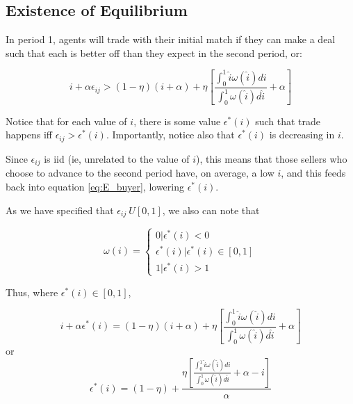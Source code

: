 \documentclass[WP]{AEA}
\begin{document}
\subsection{Existence of Equilibrium}

In period 1, agents will trade with their initial match if they can make a deal such that each is better off than they expect in the second period, or:

\begin{equation} \label{eq:ec_condition_raw}
 i+\alpha \epsilon_{ij} >(1-\eta)(i+\alpha ) + \eta  \left[ \frac{\int_0^1 \hat{i} \omega(\hat{i}) di}{\int_0^1  \omega(\hat{i}) d\hat{i}} + \alpha \right] 
 \end{equation}

Notice that for each value of $i$, there is some value $\epsilon^* (i)$ such that trade happens iff $\epsilon_{ij} > \epsilon^* (i)$.  Importantly, notice also that $\epsilon^* (i)$ is decreasing in $i$.

Since $\epsilon_{ij}$ is iid (ie, unrelated to the value of $i$), this means that those sellers who choose to advance to the second period have, on average, a low $i$, and this feeds back into equation \ref{eq:E_buyer}, lowering  $\epsilon^* (i)$. 


As we have specified that $\epsilon_{ij} ~ U[0,1]$, we also can note that 

\begin{equation} \label{eq:omega_epsilon}
\omega(i) =
	\begin{cases}
		0 |  \epsilon^* (i) < 0 \\
		\epsilon^* (i) | \epsilon^* (i) \in [0,1] \\
		1 |  \epsilon^* (i) > 1
	\end{cases}
\end{equation}



Thus, where $ \epsilon^* (i) \in [0,1]$,

\begin{equation}
 i+\alpha \epsilon^*(i) = (1-\eta)(i+\alpha ) + \eta  \left[ \frac{\int_0^1 \hat{i} \omega(\hat{i}) di}{\int_0^1  \omega(\hat{i}) d\hat{i}} + \alpha \right] 
\end{equation}
or
\begin{equation} \label{eq:e_star_unsolved}
 \epsilon^*(i) = (1-\eta) + \frac{   \eta \left[ \frac{\int_0^1 \hat{i} \omega(\hat{i}) di}{\int_0^1  \omega(\hat{i}) d\hat{i}} + \alpha -i \right] }{\alpha} 
\end{equation}
\end{document}
